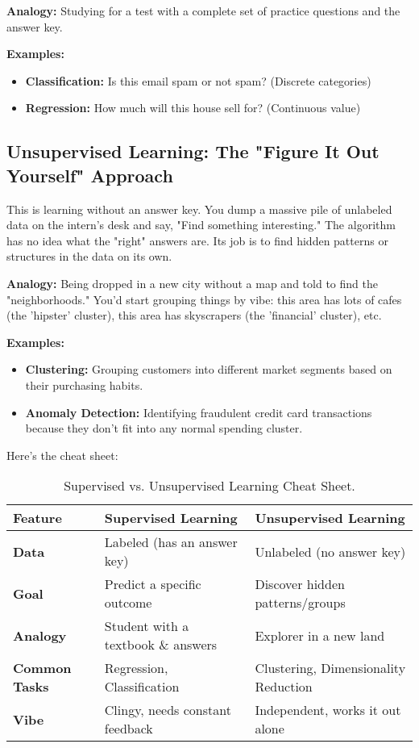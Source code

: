 \documentclass[11pt, letterpaper, openany]{book}
\begin{document}
\textbf{Analogy:} Studying for a test with a complete set of practice questions and the answer key.

\textbf{Examples:}
\begin{itemize}
    \item \textbf{Classification:} Is this email spam or not spam? (Discrete categories)
    \item \textbf{Regression:} How much will this house sell for? (Continuous value)
\end{itemize}

\subsection{Unsupervised Learning: The "Figure It Out Yourself" Approach}

This is learning without an answer key. You dump a massive pile of unlabeled data on the intern's desk and say, "Find something interesting." The algorithm has no idea what the "right" answers are. Its job is to find hidden patterns or structures in the data on its own.

\textbf{Analogy:} Being dropped in a new city without a map and told to find the "neighborhoods." You'd start grouping things by vibe: this area has lots of cafes (the 'hipster' cluster), this area has skyscrapers (the 'financial' cluster), etc.

\textbf{Examples:}
\begin{itemize}
    \item \textbf{Clustering:} Grouping customers into different market segments based on their purchasing habits.
    \item \textbf{Anomaly Detection:} Identifying fraudulent credit card transactions because they don't fit into any normal spending cluster.
\end{itemize}

Here's the cheat sheet:
\begin{table}[h!]
\centering
\begin{tabular}{|l|p{5cm}|p{5cm}|}
\hline
\textbf{Feature} & \textbf{Supervised Learning} & \textbf{Unsupervised Learning} \\
\hline
\textbf{Data} & Labeled (has an answer key) & Unlabeled (no answer key) \\
\hline
\textbf{Goal} & Predict a specific outcome & Discover hidden patterns/groups \\
\hline
\textbf{Analogy} & Student with a textbook \& answers & Explorer in a new land \\
\hline
\textbf{Common Tasks} & Regression, Classification & Clustering, Dimensionality Reduction \\
\hline
\textbf{Vibe} & Clingy, needs constant feedback & Independent, works it out alone \\
\hline
\end{tabular}
\caption{Supervised vs. Unsupervised Learning Cheat Sheet.}
\end{table}
\end{document}
